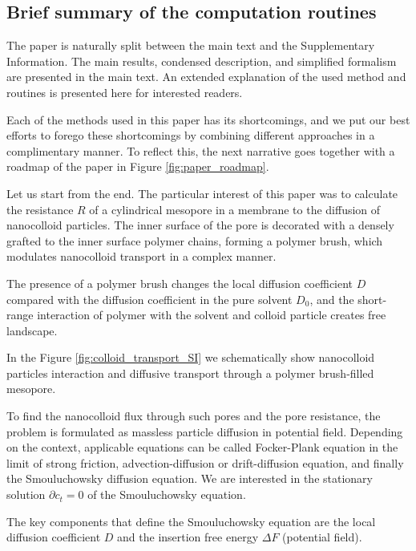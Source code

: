 \documentclass[12pt, a4paper]{article}
\begin{document}
\subsection*{Brief summary of the computation routines}

The paper is naturally split between the main text and the Supplementary Information. 
The main results, condensed description, and simplified formalism are presented in the main text.
An extended explanation of the used method and routines is presented here for interested readers. 

Each of the methods used in this paper has its shortcomings, and we put our best efforts to forego these shortcomings by combining different approaches in a complimentary manner. 
To reflect this, the next narrative goes together with a roadmap of the paper in Figure \ref{fig:paper_roadmap}.

Let us start from the end. The particular interest of this paper was to calculate the resistance $R$ of a cylindrical mesopore in a membrane to the diffusion of nanocolloid particles. 
The inner surface of the pore is decorated with a densely grafted to the inner surface polymer chains, forming a polymer brush, which modulates nanocolloid transport in a complex manner.

The presence of a polymer brush changes the local diffusion coefficient $D$ compared with the diffusion coefficient in the pure solvent $D_0$, and the short-range interaction of polymer with the solvent and colloid particle creates free landscape.

In the Figure \ref{fig:colloid_transport_SI} we schematically show nanocolloid particles interaction and diffusive transport through a polymer brush-filled mesopore. 

To find the nanocolloid flux through such pores and the pore resistance, the problem is formulated as massless particle diffusion in potential field.
Depending on the context, applicable equations can be called Focker-Plank equation in the limit of strong friction, advection-diffusion or drift-diffusion equation, and finally the Smouluchowsky diffusion equation.
We are interested in the stationary solution $\partial c_t = 0$ of the Smouluchowsky equation.

The key components that define the Smouluchowsky equation are the local diffusion coefficient $D$ and the insertion free energy $\Delta F$ (potential field). 
\end{document}
